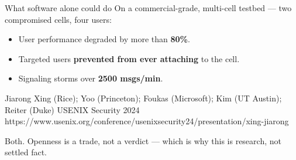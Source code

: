 \begin{frame}{What software alone could do}
  \small
  On a commercial-grade, multi-cell testbed --- two compromised cells, four users:
  \begin{itemize}\itemsep2pt
    \item User performance degraded by more than \textbf{80\%}.
    \item Targeted users \textbf{prevented from ever attaching} to the cell.
    \item Signaling storms  over \textbf{2500 msgs/min}.
  \end{itemize}

  \vspace{0.1em}
    {Jiarong Xing (Rice); Yoo (Princeton); Foukas (Microsoft); Kim (UT Austin); Reiter (Duke)}
    {USENIX Security 2024}
    {https://www.usenix.org/conference/usenixsecurity24/presentation/xing-jiarong}

     {Both. Openness is a trade, not a verdict --- which is why this is research,
      not settled fact.}
\end{frame}




